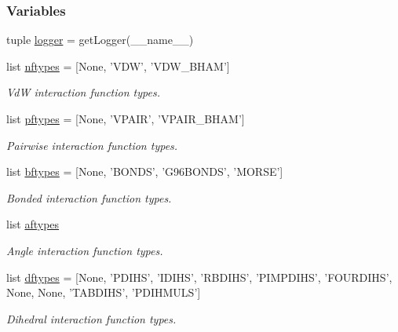 \subsubsection*{\-Variables}
\begin{DoxyCompactItemize}
\item 
tuple \hyperlink{namespaceforcebalance_1_1gmxio_a1ba0eaad8ffef47e3afff245dd1e3dcf}{logger} = get\-Logger(\-\_\-\-\_\-name\-\_\-\-\_\-)
\item 
list \hyperlink{namespaceforcebalance_1_1gmxio_a1273a5830d780475a2d07385c60341f6}{nftypes} = \mbox{[}\-None, '\-V\-D\-W', '\-V\-D\-W\-\_\-\-B\-H\-A\-M'\mbox{]}
\begin{DoxyCompactList}\small\item\em \-Vd\-W interaction function types. \end{DoxyCompactList}\item 
list \hyperlink{namespaceforcebalance_1_1gmxio_a1e3fab50f3ebc3477ff3fb31671e840b}{pftypes} = \mbox{[}\-None, '\-V\-P\-A\-I\-R', '\-V\-P\-A\-I\-R\-\_\-\-B\-H\-A\-M'\mbox{]}
\begin{DoxyCompactList}\small\item\em \-Pairwise interaction function types. \end{DoxyCompactList}\item 
list \hyperlink{namespaceforcebalance_1_1gmxio_ac8e059e7c8d46326654f585b23f2d0b0}{bftypes} = \mbox{[}\-None, '\-B\-O\-N\-D\-S', '\-G96\-B\-O\-N\-D\-S', '\-M\-O\-R\-S\-E'\mbox{]}
\begin{DoxyCompactList}\small\item\em \-Bonded interaction function types. \end{DoxyCompactList}\item 
list \hyperlink{namespaceforcebalance_1_1gmxio_ac655fded3f739845c1a803fc4123a593}{aftypes}
\begin{DoxyCompactList}\small\item\em \-Angle interaction function types. \end{DoxyCompactList}\item 
list \hyperlink{namespaceforcebalance_1_1gmxio_a5520b315e210120bb3e14af3665d568c}{dftypes} = \mbox{[}\-None, '\-P\-D\-I\-H\-S', '\-I\-D\-I\-H\-S', '\-R\-B\-D\-I\-H\-S', '\-P\-I\-M\-P\-D\-I\-H\-S', '\-F\-O\-U\-R\-D\-I\-H\-S', \-None, \-None, '\-T\-A\-B\-D\-I\-H\-S', '\-P\-D\-I\-H\-M\-U\-L\-S'\mbox{]}
\begin{DoxyCompactList}\small\item\em \-Dihedral interaction function types. \end{DoxyCompactList}\item 

\end{DoxyCompactItemize}
